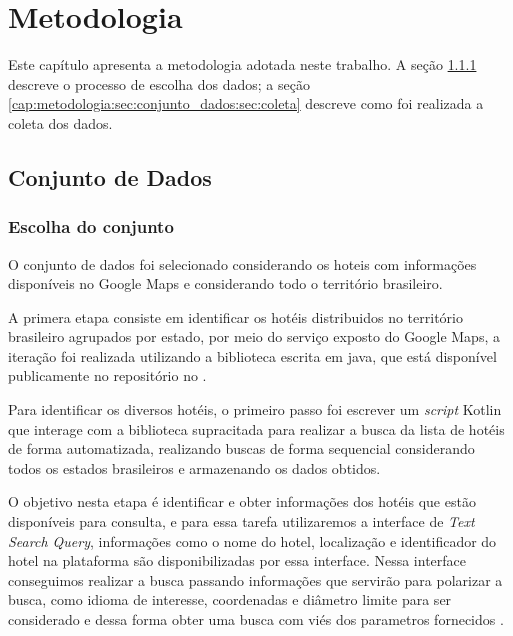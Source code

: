 \chapter{Metodologia}
\label{cap:metodologia}

Este capítulo apresenta a metodologia adotada neste trabalho. A seção \ref{cap:metodologia:sec:conjunto_dados:sec:escolha_conjunto} descreve o processo de escolha dos dados; a seção \ref{cap:metodologia:sec:conjunto_dados:sec:coleta} descreve como foi realizada a coleta dos dados.


\section{Conjunto de Dados}
\label{cap:metodologia:sec:conjunto_dados}

\subsection{Escolha do conjunto}
\label{cap:metodologia:sec:conjunto_dados:sec:escolha_conjunto}

O conjunto de dados foi selecionado considerando os hoteis com informações disponíveis no Google Maps e considerando todo o território brasileiro.

A primera etapa consiste em identificar os hotéis distribuidos no território brasileiro agrupados por estado, por meio do serviço exposto do Google Maps, a iteração foi realizada utilizando a biblioteca escrita em java,  que está disponível publicamente no repositório no .

Para identificar os diversos hotéis, o primeiro passo foi escrever um \emph{script} Kotlin  que interage com a biblioteca supracitada para realizar a busca da lista de hotéis de forma automatizada, realizando buscas de forma sequencial considerando todos os estados brasileiros e armazenando os dados obtidos.

O objetivo nesta etapa é identificar e obter informações dos hotéis que estão disponíveis para consulta, e para essa tarefa utilizaremos a interface de \emph{Text Search Query}, informações como o nome do hotel, localização e identificador do hotel na plataforma são disponibilizadas por essa interface. Nessa interface conseguimos realizar a busca passando informações que servirão para polarizar a busca, como idioma de interesse, coordenadas e diâmetro limite para ser considerado e dessa forma obter uma busca com viés dos parametros fornecidos \cite{placesSearchText2023}.

